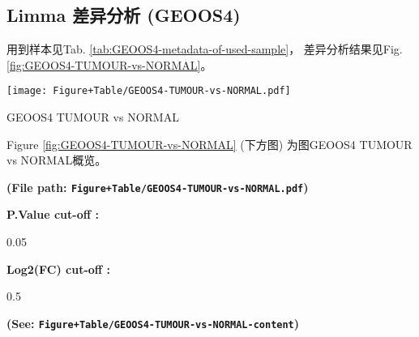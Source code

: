 \documentclass[
]{article}
\begin{document}
\hypertarget{limma-ux5deeux5f02ux5206ux6790-geoos4}{%
\subsection{Limma 差异分析 (GEOOS4)}\label{limma-ux5deeux5f02ux5206ux6790-geoos4}}

用到样本见Tab. \ref{tab:GEOOS4-metadata-of-used-sample}，
差异分析结果见Fig. \ref{fig:GEOOS4-TUMOUR-vs-NORMAL}。

\begin{center}\vspace{1.5cm}\end{center}
\def\@captype{figure}
\begin{center}
\texttt{[image: Figure+Table/GEOOS4-TUMOUR-vs-NORMAL.pdf]}
\caption{GEOOS4 TUMOUR vs NORMAL}\label{fig:GEOOS4-TUMOUR-vs-NORMAL}
\end{center}

Figure \ref{fig:GEOOS4-TUMOUR-vs-NORMAL} (下方图) 为图GEOOS4 TUMOUR vs NORMAL概览。

\textbf{(File path: \texttt{Figure+Table/GEOOS4-TUMOUR-vs-NORMAL.pdf})}

\begin{center}\vspace{1.5cm}\end{center}\begin{center}\begin{tcolorbox}[colback=gray!10, colframe=gray!50, width=0.9\linewidth, arc=1mm, boxrule=0.5pt]
\textbf{
P.Value cut-off
:}

\vspace{0.5em}

    0.05

\vspace{2em}


\textbf{
Log2(FC) cut-off
:}

\vspace{0.5em}

    0.5

\vspace{2em}
\end{tcolorbox}
\end{center}

\textbf{(See: \texttt{Figure+Table/GEOOS4-TUMOUR-vs-NORMAL-content})}

\begin{center}\vspace{1.5cm}\end{center}
\end{document}
